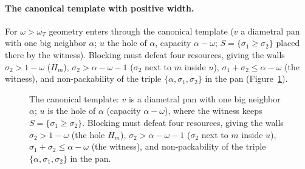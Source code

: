\documentclass[11pt]{article}
\theoremstyle{definition}
\begin{document}
\paragraph{The canonical template with positive width.}
For $\omega>\omega_T$ geometry enters through the canonical template
($v$ a diametral pan with one big neighbor $\alpha$; $u$ the hole of
$\alpha$, capacity $\alpha-\omega$; $S=\{\sigma_1\ge\sigma_2\}$ placed there
by the witness). Blocking must defeat four resources, giving the walls
$\sigma_2>1-\omega$ ($H_m$), $\sigma_2>\alpha-\omega-1$ ($\sigma_2$ next to
$m$ inside $u$), $\sigma_1+\sigma_2\le\alpha-\omega$ (the witness), and
non-packability of the triple $\{\alpha,\sigma_1,\sigma_2\}$ in the pan
(Figure~\ref{fig:canonical}).
\begin{figure}[ht]
\centering
{}
\caption{The canonical template: $v$ is a diametral pan with one big
neighbor $\alpha$; $u$ is the hole of $\alpha$ (capacity
$\alpha-\omega$), where the witness keeps
$S=\{\sigma_1\ge\sigma_2\}$. Blocking must defeat four resources,
giving the walls $\sigma_2>1-\omega$ (the hole $H_m$),
$\sigma_2>\alpha-\omega-1$ ($\sigma_2$ next to $m$ inside $u$),
$\sigma_1+\sigma_2\le\alpha-\omega$ (the witness), and
non-packability of the triple $\{\alpha,\sigma_1,\sigma_2\}$ in the
pan.}
\label{fig:canonical}
\end{figure}
\end{document}
